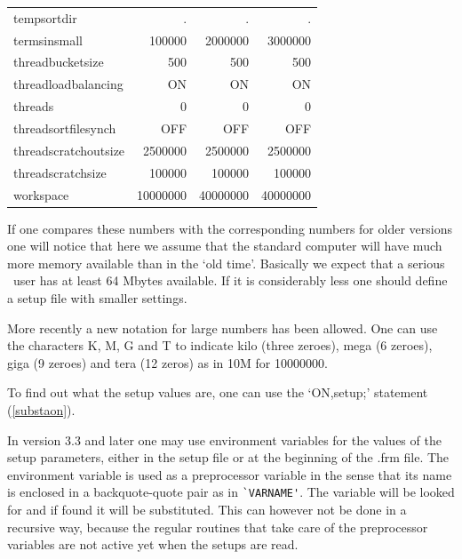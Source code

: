 \begin{center}
\begin{tabular}{lrrr}
tempsortdir &           .             & .           & .            \\
termsinsmall &          100000        & 2000000     & 3000000      \\
threadbucketsize &      500           & 500         & 500          \\
threadloadbalancing &   ON            & ON          & ON           \\
threads &               0             & 0           & 0            \\
threadsortfilesynch &   OFF           & OFF         & OFF          \\
threadscratchoutsize &  2500000       & 2500000     & 2500000      \\
threadscratchsize &     100000        & 100000      & 100000       \\
workspace &             10000000      & 40000000    & 40000000    
\end{tabular}
\end{center}
If one compares these numbers with the corresponding numbers for older 
versions one will notice that here we assume that the standard computer 
will have much more memory available than in the `old time'. Basically we 
expect that a serious \FORM\ user has at least 64 Mbytes available. If it is 
considerably less one should define a setup file with smaller settings.

More recently a new notation for large numbers has been allowed. One can 
use the characters K, M, G and T to indicate kilo (three zeroes), mega (6 
zeroes), giga (9 zeroes) and tera (12 zeros) as in 10M for 10000000.

To find out what the setup values are, one can use the `ON,setup;' 
statement (\ref{substaon}).

In version 3.3 and later one may use environment 
variables for the values of the setup parameters, either in the setup file 
or at the beginning of the .frm file. The environment variable is used as a 
preprocessor variable in the sense that its name is enclosed in a 
backquote-quote pair as in \verb:`VARNAME':. The variable will be looked 
for and if found it will be substituted. This can however not be done in a 
recursive way, because the regular routines that take care of the 
preprocessor variables are not active yet when the setups are read.
